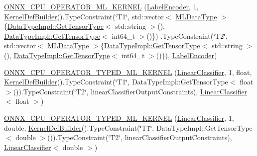 \begin{DoxyCompactItemize}
\mbox{\hyperlink{namespaceonnxruntime_1_1ml_af3a551163100eecfed608c15a135736d}{O\+N\+N\+X\+\_\+\+C\+P\+U\+\_\+\+O\+P\+E\+R\+A\+T\+O\+R\+\_\+\+M\+L\+\_\+\+K\+E\+R\+N\+EL}} (\mbox{\hyperlink{classonnxruntime_1_1ml_1_1LabelEncoder}{Label\+Encoder}}, 1, \mbox{\hyperlink{classonnxruntime_1_1KernelDefBuilder}{Kernel\+Def\+Builder}}().Type\+Constraint(\char`\"{}T1\char`\"{}, std\+::vector$<$ \mbox{\hyperlink{namespaceonnxruntime_ad77d0a6e838ec7da5dc35fed5ee66b49}{M\+L\+Data\+Type}} $>$\{\mbox{\hyperlink{classonnxruntime_1_1DataTypeImpl_a7c4a6a7126bc7661eb67af6dfcfad1fb}{Data\+Type\+Impl\+::\+Get\+Tensor\+Type}}$<$ std\+::string $>$(), \mbox{\hyperlink{classonnxruntime_1_1DataTypeImpl_a7c4a6a7126bc7661eb67af6dfcfad1fb}{Data\+Type\+Impl\+::\+Get\+Tensor\+Type}}$<$ int64\+\_\+t $>$()\}) .Type\+Constraint(\char`\"{}T2\char`\"{}, std\+::vector$<$ \mbox{\hyperlink{namespaceonnxruntime_ad77d0a6e838ec7da5dc35fed5ee66b49}{M\+L\+Data\+Type}} $>$\{\mbox{\hyperlink{classonnxruntime_1_1DataTypeImpl_a7c4a6a7126bc7661eb67af6dfcfad1fb}{Data\+Type\+Impl\+::\+Get\+Tensor\+Type}}$<$ std\+::string $>$(), \mbox{\hyperlink{classonnxruntime_1_1DataTypeImpl_a7c4a6a7126bc7661eb67af6dfcfad1fb}{Data\+Type\+Impl\+::\+Get\+Tensor\+Type}}$<$ int64\+\_\+t $>$()\}), \mbox{\hyperlink{classonnxruntime_1_1ml_1_1LabelEncoder}{Label\+Encoder}})
\item 
\mbox{\hyperlink{namespaceonnxruntime_1_1ml_a34aebc377bd061c373c653dcda288d1b}{O\+N\+N\+X\+\_\+\+C\+P\+U\+\_\+\+O\+P\+E\+R\+A\+T\+O\+R\+\_\+\+T\+Y\+P\+E\+D\+\_\+\+M\+L\+\_\+\+K\+E\+R\+N\+EL}} (\mbox{\hyperlink{classonnxruntime_1_1ml_1_1LinearClassifier}{Linear\+Classifier}}, 1, float, \mbox{\hyperlink{classonnxruntime_1_1KernelDefBuilder}{Kernel\+Def\+Builder}}().Type\+Constraint(\char`\"{}T1\char`\"{}, Data\+Type\+Impl\+::\+Get\+Tensor\+Type$<$ float $>$()).Type\+Constraint(\char`\"{}T2\char`\"{}, linear\+Classifier\+Output\+Constraints), \mbox{\hyperlink{classonnxruntime_1_1ml_1_1LinearClassifier}{Linear\+Classifier}}$<$ float $>$)
\item 
\mbox{\hyperlink{namespaceonnxruntime_1_1ml_af1bcaa7c757b89554d63629b30a6655f}{O\+N\+N\+X\+\_\+\+C\+P\+U\+\_\+\+O\+P\+E\+R\+A\+T\+O\+R\+\_\+\+T\+Y\+P\+E\+D\+\_\+\+M\+L\+\_\+\+K\+E\+R\+N\+EL}} (\mbox{\hyperlink{classonnxruntime_1_1ml_1_1LinearClassifier}{Linear\+Classifier}}, 1, double, \mbox{\hyperlink{classonnxruntime_1_1KernelDefBuilder}{Kernel\+Def\+Builder}}().Type\+Constraint(\char`\"{}T1\char`\"{}, Data\+Type\+Impl\+::\+Get\+Tensor\+Type$<$ double $>$()).Type\+Constraint(\char`\"{}T2\char`\"{}, linear\+Classifier\+Output\+Constraints), \mbox{\hyperlink{classonnxruntime_1_1ml_1_1LinearClassifier}{Linear\+Classifier}}$<$ double $>$)

\end{DoxyCompactItemize}
